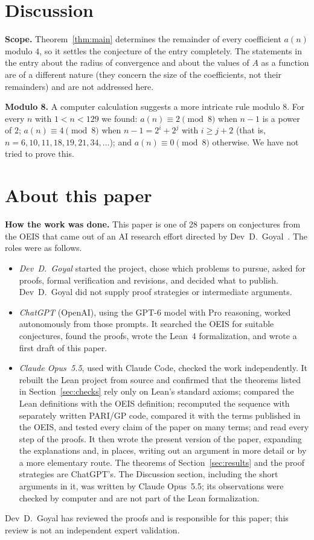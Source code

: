 \documentclass[11pt,a4paper]{article}
\theoremstyle{definition}
\theoremstyle{remark}
\newcommand{\para}[1]{\par\medskip\noindent\textbf{#1}\enspace}
\begin{document}
\section{Discussion}\label{sec:discussion}

\para{Scope.} Theorem~\ref{thm:main} determines the remainder of every coefficient $a(n)$ modulo $4$, so it settles the
conjecture of the entry completely. The statements in the entry about the radius of convergence and about the values of
$A$ as a function are of a different nature (they concern the size of the coefficients, not their remainders) and are not
addressed here.

\para{Modulo 8.} A computer calculation suggests a more intricate rule modulo $8$. For every $n$ with $1<n<129$ we found:
$a(n)\equiv2\pmod8$ when $n-1$ is a power of $2$; $a(n)\equiv4\pmod8$ when $n-1=2^i+2^j$ with $i\ge j+2$ (that is,
$n=6,10,11,18,19,21,34,\dots$); and $a(n)\equiv0\pmod8$ otherwise. We have not tried to prove this.

\section*{About this paper}\label{sec:about}
\para{How the work was done.}
This paper is one of 28 papers on conjectures from the OEIS that came out of an AI research effort directed by
Dev~D.~Goyal~\cite{repo}. The roles were as follows.
\begin{itemize}
\item \emph{Dev~D.~Goyal} started the project, chose which problems to pursue, asked for proofs, formal verification and
revisions, and decided what to publish. Dev~D.~Goyal did not supply proof strategies or intermediate arguments.
\item \emph{ChatGPT} (OpenAI), using the GPT-6 model with Pro reasoning, worked autonomously from those prompts. It
searched the OEIS for suitable conjectures, found the proofs, wrote the Lean~4 formalization, and wrote a first draft
of this paper.
\item \emph{Claude Opus~5.5}, used with Claude Code, checked the work independently. It rebuilt the Lean project from source and confirmed that the theorems listed in Section~\ref{sec:checks} rely only on
Lean's standard axioms; compared the Lean definitions with the OEIS definition; recomputed the sequence with separately
written PARI/GP code, compared it with the terms published in the OEIS, and tested every claim of the paper on many
terms; and read every step of the proofs. It then wrote the present version of the paper, expanding the
explanations and, in places, writing out an argument in more detail or by a more elementary route. The theorems of
Section~\ref{sec:results} and the proof strategies are ChatGPT's. The Discussion section, including the short arguments
in it, was written by Claude Opus~5.5; its observations were checked by computer and are not part of the Lean
formalization.
\end{itemize}
Dev~D.~Goyal has reviewed the proofs and is responsible for this paper; this review is not an independent expert
validation.
\end{document}
